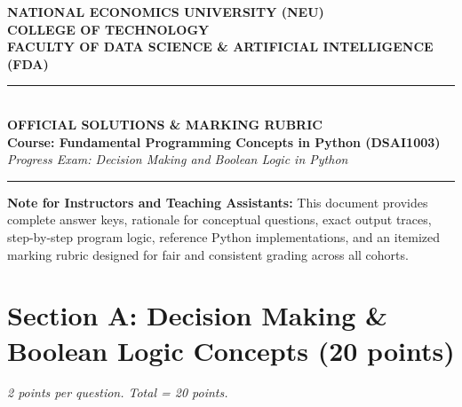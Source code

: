\documentclass[11pt,a4paper]{article}
\begin{document}
\begin{center}
  {\Large\textbf{NATIONAL ECONOMICS UNIVERSITY (NEU)}}\\[0.15cm]
  {\large\textbf{COLLEGE OF TECHNOLOGY}}\\[0.10cm]
  {\large\textbf{FACULTY OF DATA SCIENCE \& ARTIFICIAL INTELLIGENCE (FDA)}}\\[0.25cm]
  \rule{\textwidth}{1.2pt}\\[0.3cm]
  {\LARGE\bfseries\color{primaryblue}OFFICIAL SOLUTIONS \& MARKING RUBRIC}\\[0.15cm]
  {\large\textbf{Course: Fundamental Programming Concepts in Python (DSAI1003)}}\\[0.15cm]
  {\normalsize\textit{Progress Exam: Decision Making and Boolean Logic in Python}}\\[0.2cm]
  \rule{\textwidth}{0.6pt}
\end{center}

\vspace{0.2cm}

\begin{tcolorbox}[colback=green!8, colframe=correctgreen, arc=1.5mm]
\small
\textbf{Note for Instructors and Teaching Assistants:}
This document provides complete answer keys, rationale for conceptual questions, exact output traces, step-by-step program logic, reference Python implementations, and an itemized marking rubric designed for fair and consistent grading across all cohorts.
\end{tcolorbox}

\vspace{0.2cm}

\section*{Section A: Decision Making \& Boolean Logic Concepts (20 points)}
\textit{2 points per question. Total = 20 points.}
\end{document}
